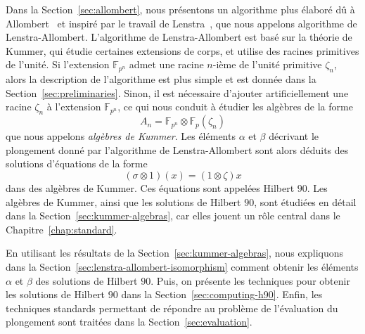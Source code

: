 Dans la Section~\ref{sec:allombert}, nous présentons un algorithme plus élaboré
dû à Allombert~\cite{Allombert02} et inspiré par le travail de
Lenstra~\cite{Lenstra91}, que nous appelons algorithme de Lenstra-Allombert.
L'algorithme de Lenstra-Allombert est basé sur la théorie de Kummer, qui étudie
certaines extensions de corps, et utilise des racines primitives de l'unité. Si
l'extension $\mathbb{F}_{p^{n}}$ admet une racine $n$-ième de l'unité primitive
$\zeta_n$,
alors la description de l'algorithme est plus simple et est donnée dans la
Section~\ref{sec:preliminaries}. Sinon, il est nécessaire d'ajouter
artificiellement une racine $\zeta_n$ à l'extension $\mathbb{F}_{p^{n}}$, ce qui
nous conduit à étudier les algèbres de la forme
\[
  A_n = \mathbb{F}_{p^{n}}\otimes\mathbb{F}_p(\zeta_n)
\]
que nous appelons \emph{algèbres de Kummer}. Les éléments $\alpha$ et $\beta$
décrivant le plongement donné par l'algorithme de Lenstra-Allombert sont alors
déduits des solutions d'équations de la forme
\[
  (\sigma\otimes1)(x) = (1\otimes\zeta)x
\]
dans des algèbres de Kummer. Ces équations sont appelées Hilbert $90$. Les
algèbres de Kummer, ainsi que les solutions de Hilbert $90$, sont étudiées en
détail dans la Section~\ref{sec:kummer-algebras}, car elles jouent un rôle
central dans le Chapitre~\ref{chap:standard}.

En utilisant les résultats de la Section~\ref{sec:kummer-algebras}, nous
expliquons dans la Section~\ref{sec:lenstra-allombert-isomorphism} comment
obtenir les éléments $\alpha$ et $\beta$ des solutions de Hilbert $90$. Puis,
on présente les techniques pour obtenir les solutions de Hilbert $90$ dans la
Section~\ref{sec:computing-h90}. Enfin, les techniques standards permettant de
répondre au problème de l'évaluation du plongement sont traitées dans la
Section~\ref{sec:evaluation}.

